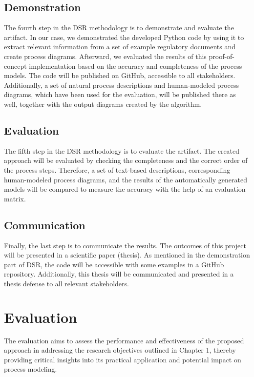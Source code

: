 \subsection{Demonstration} 
The fourth step in the DSR methodology is to demonstrate and evaluate the artifact. In our case, we demonstrated the developed Python code by using it to extract relevant information from a set of example regulatory documents and create process diagrams. Afterward, we evaluated the results of this proof-of-concept implementation based on the accuracy and completeness of the process models. The code will be published on GitHub, accessible to all stakeholders. Additionally, a set of natural process descriptions and human-modeled process diagrams, which have been used for the evaluation, will be published there as well, together with the output diagrams created by the algorithm.

\subsection{Evaluation}
The fifth step in the DSR methodology is to evaluate the artifact. The created approach will be evaluated by checking the completeness and the correct order of the process steps. Therefore, a set of text-based descriptions, corresponding human-modeled process diagrams, and the results of the automatically generated models will be compared to measure the accuracy with the help of an evaluation matrix.

\subsection{Communication}
Finally, the last step is to communicate the results. The outcomes of this project will be presented in a scientific paper (thesis). As mentioned in the demonstration part of DSR, the code will be accessible with some examples in a GitHub repository. Additionally, this thesis will be communicated and presented in a thesis defense to all relevant stakeholders.

\pagebreak

\section{Evaluation}
\label{sec:intro:ev}

The evaluation aims to assess the performance and effectiveness of the proposed approach in addressing the research objectives outlined in Chapter 1, thereby providing critical insights into its practical application and potential impact on process modeling. 

